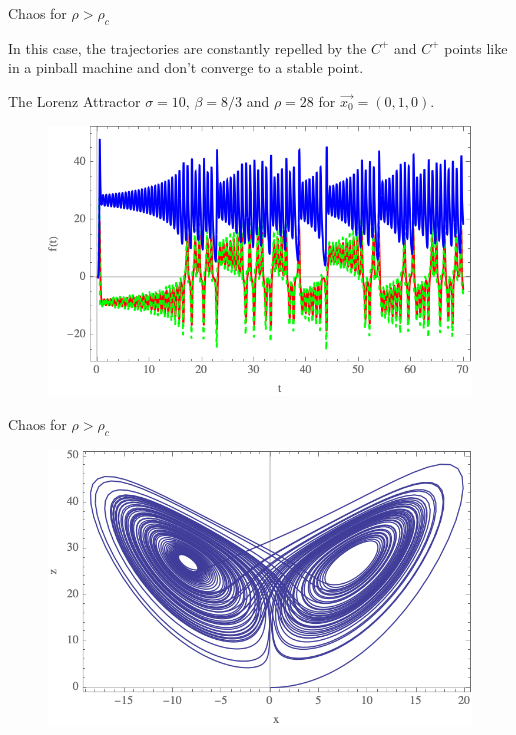 \documentclass[hyperref={pdfpagelabels=false}]{beamer}
\begin{document}
\begin{frame}{Chaos for $\rho>\rho_{c}$}

In this case, the trajectories are constantly repelled by the $C^{+}$ and $C^{+}$ points like in a pinball machine and don't converge to a stable point.
 
\begin{block}{The Lorenz Attractor}
\centering
$\sigma=10$, $\beta=8/3$ and $\rho=28$ for $\Vec{x_{0}}=(0,1,0)$.
\end{block}

\begin{figure}

\includegraphics[width=0.65\linewidth]{Figures/seriedetiempo.png}

\end{figure}

\end{frame}

\begin{frame}{Chaos for $\rho>\rho_{c}$}

\begin{figure}

\includegraphics[width=0.9\linewidth]{Figures/atractor2d.png}

\end{figure}

\end{frame}
\end{document}
